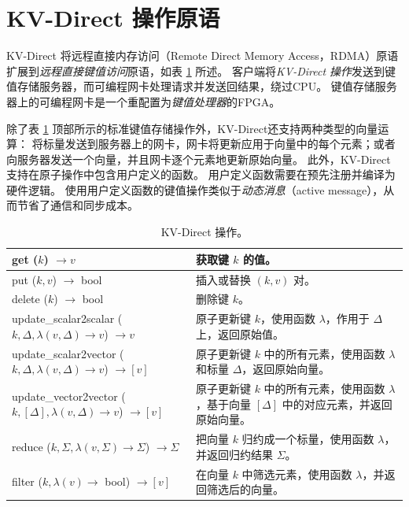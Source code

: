 \section{KV-Direct 操作原语}
\label{kvdirect:sec:architecture}
\label{kvdirect:sec:kv-operations}

KV-Direct 将远程直接内存访问（Remote Direct Memory Access，RDMA）原语扩展到\textit {远程直接键值访问}原语，如表 \ref {kvdirect:tab:kv-operations} 所述。
客户端将\textit {KV-Direct 操作}发送到键值存储服务器，而可编程网卡处理请求并发送回结果，绕过CPU。
键值存储服务器上的可编程网卡是一个重配置为\textit {键值处理器}的FPGA。

除了表 \ref {kvdirect:tab:kv-operations} 顶部所示的标准键值存储操作外，KV-Direct还支持两种类型的向量运算：
将标量发送到服务器上的网卡，网卡将更新应用于向量中的每个元素；或者向服务器发送一个向量，并且网卡逐个元素地更新原始向量。
此外，KV-Direct 支持在原子操作中包含用户定义的函数。
用户定义函数需要在预先注册并编译为硬件逻辑。
使用用户定义函数的键值操作类似于\textit {动态消息}（active message）\cite {eicken1992active}，从而节省了通信和同步成本。


\begin{table}
\centering
\caption{KV-Direct 操作。}
\label{kvdirect:tab:kv-operations}
\small
\begin{tabular}{p{}|p{} }
\toprule
get ($k$) $\rightarrow v$ & 获取键 $k$ 的值。 \\
\midrule
put ($k, v$) $\rightarrow$ bool & 插入或替换 $(k, v)$ 对。 \\
\midrule
delete ($k$) $\rightarrow$ bool & 删除键 $k$。 \\
\midrule
\midrule
update{\_}scalar2scalar ($k, \Delta, \lambda(v, \Delta) \rightarrow v$) $\rightarrow v$ & 原子更新键 $k$，使用函数 $\lambda$，作用于 $\Delta$ 上，返回原始值。\\
\midrule
update{\_}scalar2vector ($k, \Delta, \lambda(v, \Delta) \rightarrow v$) $\rightarrow [v]$ & 原子更新键 $k$ 中的所有元素，使用函数 $\lambda$ 和标量 $\Delta$，返回原始向量。 \\
\midrule
update{\_}vector2vector ($k, [\Delta], \lambda(v, \Delta) \rightarrow v$) $\rightarrow [v]$ & 原子更新键 $k$ 中的所有元素，使用函数 $\lambda$，基于向量 $[\Delta]$ 中的对应元素，并返回原始向量。 \\
\midrule
reduce ($k, \Sigma, \lambda(v, \Sigma) \rightarrow \Sigma$) $\rightarrow \Sigma$ & 把向量 $k$ 归约成一个标量，使用函数 $\lambda$，并返回归约结果 $\Sigma$。 \\
\midrule
filter ($k, \lambda(v) \rightarrow$ bool) $\rightarrow [v]$ & 在向量 $k$ 中筛选元素，使用函数 $\lambda$，并返回筛选后的向量。 \\
\bottomrule
\end{tabular}
\end{table}

